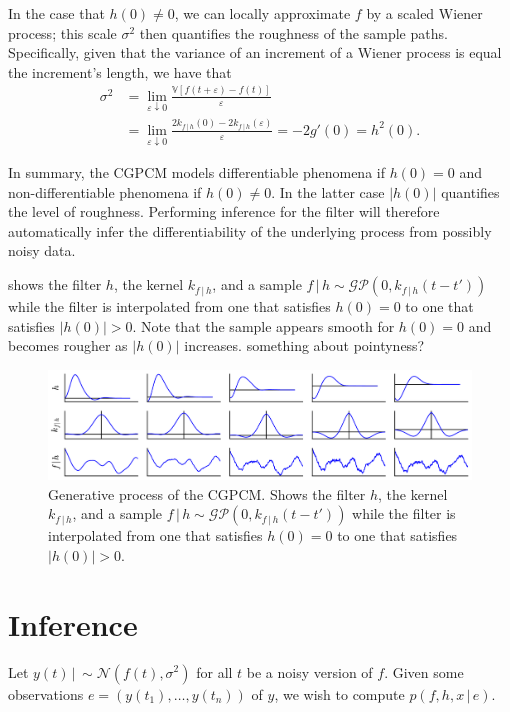 \documentclass{article}
\newcommand{\e}{\varepsilon}   %
\newcommand{\cond}{\, | \,}               %
\begin{document}
In the case that $h(0)\neq 0$, we can locally approximate $f$ by a scaled Wiener process; this scale $\sigma^2$ then quantifies the roughness of the sample paths. Specifically, given that the variance of an increment of a Wiener process is equal the increment's length, we have that
\begin{align*}
    \sigma^2
    &= \lim_{\e \downarrow 0} \frac{\mathbb{V}[f(t+\e)-f(t)]}{\e} \\
    &= \lim_{\e \downarrow 0} \frac{2k_{f\cond h}(0) - 2k_{f\cond h}(\e)}{\e}
    = -2g'(0)
    = h^2(0).
\end{align*}

In summary, the CGPCM models differentiable phenomena if $h(0)=0$ and non-differentiable phenomena if $h(0)\neq 0$. In the latter case $|h(0)|$ quantifies the level of roughness. Performing inference for the filter will therefore automatically infer the differentiability of the underlying process from possibly noisy data.

 shows the filter $h$, the kernel $k_{f\cond h}$, and a sample $f\cond h \sim \mathcal{GP}(0,k_{f\cond h}(t-t'))$ while the filter is interpolated from one that satisfies $h(0)=0$ to one that satisfies $|h(0)|>0$. Note that the sample appears smooth for $h(0)=0$ and becomes rougher as $|h(0)|$ increases. {\color{red} something about pointyness?}

\begin{figure}[t]
    \centering
    \includegraphics[width=\linewidth]{resources/interpolation.pdf}
    \caption{Generative process of the CGPCM. Shows the filter $h$, the kernel $k_{f\cond h}$, and a sample $f\cond h \sim \mathcal{GP}(0,k_{f\cond h}(t-t'))$ while the filter is interpolated from one that satisfies $h(0)=0$ to one that satisfies $|h(0)|>0$.}
    \label{fig:interpolation}
\end{figure}


\section{Inference}
\label{sec:inference}
Let $y(t)\cond \sim \mathcal{N}(f(t),\sigma^2)$ for all $t$ be a noisy version of $f$. Given some observations $e=(y(t_1),\ldots,y(t_n))$ of $y$, we wish to compute $p(f,h,x\cond e)$.
\end{document}

